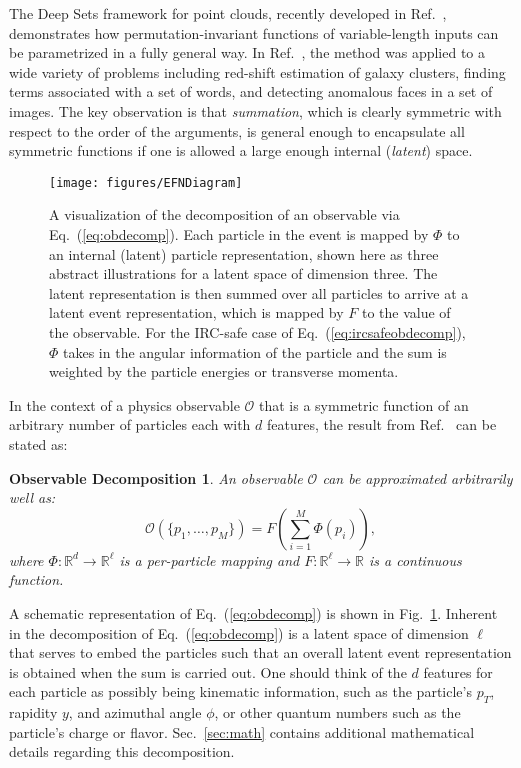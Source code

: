 \documentclass[letterpaper,11pt]{article}
\DeclareRobustCommand{\Sec}[1]{Sec.~\ref{#1}}
\DeclareRobustCommand{\Fig}[1]{Fig.~\ref{#1}}
\DeclareRobustCommand{\Eq}[1]{Eq.~(\ref{#1})}
\DeclareRobustCommand{\Ref}[1]{Ref.~\cite{#1}}
\newtheorem*{obdecomp}{Observable Decomposition}
\begin{document}
The Deep Sets framework for point clouds, recently developed in \Ref{DBLP:conf/nips/ZaheerKRPSS17}, demonstrates how permutation-invariant functions of variable-length inputs can be parametrized in a fully general way.
%
In \Ref{DBLP:conf/nips/ZaheerKRPSS17}, the method was applied to a wide variety of problems including red-shift estimation of galaxy clusters, finding terms associated with a set of words, and detecting anomalous faces in a set of images.
%
The key observation is that \emph{summation}, which is clearly symmetric with respect to the order of the arguments, is general enough to encapsulate all symmetric functions if one is allowed a large enough internal (\emph{latent}) space.


\begin{figure}[t]
\centering
\texttt{[image: figures/EFNDiagram]}
\caption{
%
A visualization of the decomposition of an observable via \Eq{eq:obdecomp}.
%
Each particle in the event is mapped by $\Phi$ to an internal (latent) particle representation, shown here as three abstract illustrations for a latent space of dimension three.
%
The latent representation is then summed over all particles to arrive at a latent event representation, which is mapped by $F$ to the value of the observable.
%
For the IRC-safe case of \Eq{eq:ircsafeobdecomp}, $\Phi$ takes in the angular information of the particle and the sum is weighted by the particle energies or transverse momenta.}
\label{fig:diagram}
\end{figure}

In the context of a physics observable $\mathcal O$ that is a symmetric function of an arbitrary number of particles each with $d$ features, the result from \Ref{DBLP:conf/nips/ZaheerKRPSS17} can be stated as:

\begin{obdecomp}
An observable $\mathcal O$ can be approximated arbitrarily well as:
\begin{equation}
\label{eq:obdecomp}
\mathcal O(\{p_1,\ldots,p_M\}) = F\left(\sum_{i=1}^M \Phi (p_i)\right),
\end{equation}
where $\Phi: \mathbb R^d \to \mathbb R^\ell$ is a per-particle mapping and $F:\mathbb R^\ell\to \mathbb R$ is a continuous function.
\end{obdecomp}
%
\noindent A schematic representation of \Eq{eq:obdecomp} is shown in \Fig{fig:diagram}.
%
Inherent in the decomposition of \Eq{eq:obdecomp} is a latent space of dimension $\ell$ that serves to embed the particles such that an overall latent event representation is obtained when the sum is carried out.
%
One should think of the $d$ features for each particle as possibly being kinematic information, such as the particle's $p_T$, rapidity $y$, and azimuthal angle $\phi$, or other quantum numbers such as the particle's charge or flavor.
%
\Sec{sec:math} contains additional mathematical details regarding this decomposition.
\end{document}
